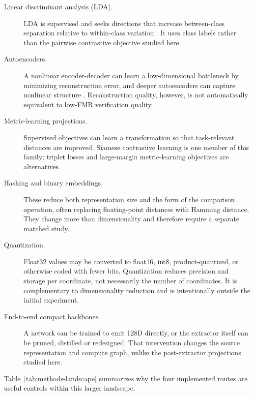 \documentclass[10pt,a4paper]{article}
\begin{document}
\begin{description}
\item[Linear discriminant analysis (LDA).] LDA is supervised and seeks directions that
increase between-class separation relative to within-class variation \cite{fisher1936}.
It uses class labels rather than the pairwise contrastive objective studied here.
\item[Autoencoders.] A nonlinear encoder-decoder can learn a low-dimensional bottleneck by
minimizing reconstruction error, and deeper autoencoders can capture nonlinear structure
\cite{hinton2006}. Reconstruction quality, however, is not automatically equivalent to
low-FMR verification quality.
\item[Metric-learning projections.] Supervised objectives can learn a transformation so
that task-relevant distances are improved. Siamese contrastive learning is one member of
this family; triplet losses and large-margin metric-learning objectives are alternatives.
\item[Hashing and binary embeddings.] These reduce both representation size and the form of
the comparison operation, often replacing floating-point distances with Hamming distance.
They change more than dimensionality and therefore require a separate matched study.
\item[Quantization.] Float32 values may be converted to float16, int8, product-quantized, or
otherwise coded with fewer bits. Quantization reduces precision and storage per coordinate,
not necessarily the number of coordinates. It is complementary to dimensionality reduction
and is intentionally outside the initial experiment.
\item[End-to-end compact backbones.] A network can be trained to emit 128D directly, or the
extractor itself can be pruned, distilled or redesigned. That intervention changes the
source representation and compute graph, unlike the post-extractor projections studied
here.
\end{description}

Table~\ref{tab:methods-landscape} summarizes why the four implemented routes are useful
controls within this larger landscape.
\end{document}
